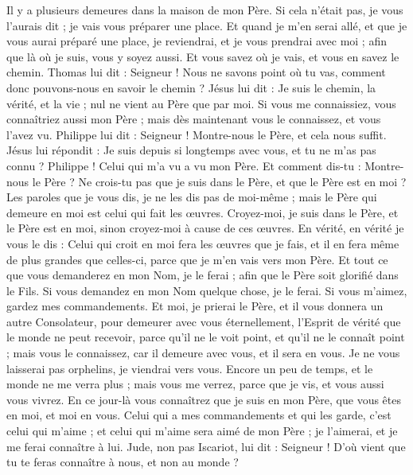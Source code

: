 \begin{multicols}{2}
Il y a plusieurs demeures dans la maison de mon Père. Si cela n'était pas, je vous l'aurais dit ; je vais vous préparer une place.
Et quand je m'en serai allé, et que je vous aurai préparé une place, je reviendrai, et je vous prendrai avec moi ; afin que là où je suis, vous y soyez aussi.
Et vous savez où je vais, et vous en savez le chemin.
Thomas lui dit : Seigneur ! Nous ne savons point où tu vas, comment donc pouvons-nous en savoir le chemin ?
Jésus lui dit : Je suis le chemin, la vérité, et la vie ; nul ne vient au Père que par moi.
Si vous me connaissiez, vous connaîtriez aussi mon Père ; mais dès maintenant vous le connaissez, et vous l'avez vu.
Philippe lui dit : Seigneur ! Montre-nous le Père, et cela nous suffit.
Jésus lui répondit : Je suis depuis si longtemps avec vous, et tu ne m'as pas connu ? Philippe ! Celui qui m'a vu a vu mon Père. Et comment dis-tu : Montre-nous le Père ?
Ne crois-tu pas que je suis dans le Père, et que le Père est en moi ? Les paroles que je vous dis, je ne les dis pas de moi-même ; mais le Père qui demeure en moi est celui qui fait les œuvres.
Croyez-moi, je suis dans le Père, et le Père est en moi, sinon croyez-moi à cause de ces œuvres.
En vérité, en vérité je vous le dis : Celui qui croit en moi fera les œuvres que je fais, et il en fera même de plus grandes que celles-ci, parce que je m'en vais vers mon Père.
Et tout ce que vous demanderez en mon Nom, je le ferai ; afin que le Père soit glorifié dans le Fils.
Si vous demandez en mon Nom quelque chose, je le ferai.
Si vous m'aimez, gardez mes commandements.
Et moi, je prierai le Père, et il vous donnera un autre Consolateur, pour demeurer avec vous éternellement,
l'Esprit de vérité que le monde ne peut recevoir, parce qu'il ne le voit point, et qu'il ne le connaît point ; mais vous le connaissez, car il demeure avec vous, et il sera en vous.
Je ne vous laisserai pas orphelins, je viendrai vers vous.
Encore un peu de temps, et le monde ne me verra plus ; mais vous me verrez, parce que je vis, et vous aussi vous vivrez.
En ce jour-là vous connaîtrez que je suis en mon Père, que vous êtes en moi, et moi en vous.
Celui qui a mes commandements et qui les garde, c'est celui qui m'aime ; et celui qui m'aime sera aimé de mon Père ; je l'aimerai, et je me ferai connaître à lui.
Jude, non pas Iscariot, lui dit : Seigneur ! D'où vient que tu te feras connaître à nous, et non au monde ?

\end{multicols}
